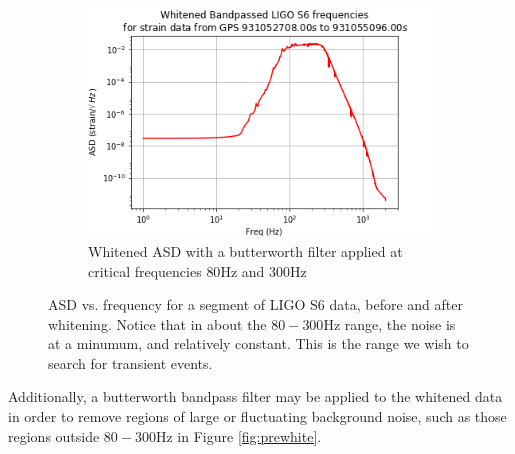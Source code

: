 \documentclass{article}
\begin{document}
\begin{figure}
\begin{subfigure}[t]{0.5\textwidth}
\includegraphics[width=\textwidth]{whitebp.png}
\caption{Whitened ASD with a butterworth filter applied at critical frequencies $80\mathrm{Hz}$ and $300\mathrm{Hz}$}
\label{fig:postwhitebp}
\end{subfigure}

\caption{ASD vs. frequency for a segment of LIGO S6 data, before and after whitening. Notice that in about the $80-300\mathrm{Hz}$ range, the noise is at a minumum, and relatively constant. This is the range we wish to search for transient events.}
\label{fig:asd}
\end{figure}

Additionally, a butterworth bandpass filter may be applied to the whitened data\citep{Blackburn2007}\citep{LIGOScientificCollaboration} in order to remove regions of large or fluctuating background noise, such as those regions outside $80-300\mathrm{Hz}$ in Figure \ref{fig:prewhite}.
\end{document}
